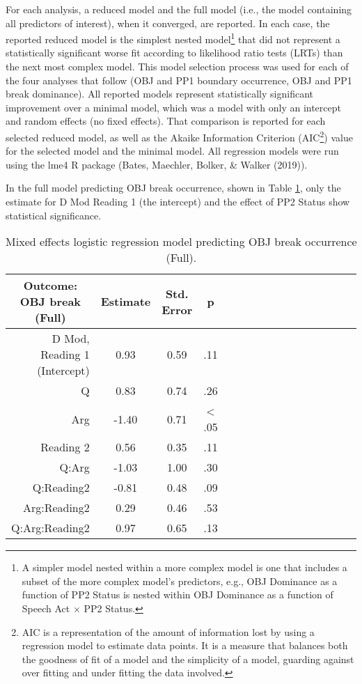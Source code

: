\documentclass[11pt,oneside]{book}
\let\rmarkdownfootnote\footnote%
\def\footnote{\protect\rmarkdownfootnote}
\begin{document}
For each analysis, a reduced model and the full model (i.e., the model containing all predictors of interest), when it converged, are reported. In each case, the reported reduced model is the simplest nested model\footnote{A simpler model nested within a more complex model is one that includes a subset of the more complex model's predictors, e.g., OBJ Dominance as a function of PP2 Status is nested within OBJ Dominance as a function of Speech Act \(\times\) PP2 Status.} that did not represent a statistically significant worse fit according to likelihood ratio tests (LRTs) than the next most complex model. This model selection process was used for each of the four analyses that follow (OBJ and PP1 boundary occurrence, OBJ and PP1 break dominance). All reported models represent statistically significant improvement over a minimal model, which was a model with only an intercept and random effects (no fixed effects). That comparison is reported for each selected reduced model, as well as the Akaike Information Criterion (AIC\footnote{AIC is a representation of the amount of information lost by using a regression model to estimate data points. It is a measure that balances both the goodness of fit of a model and the simplicity of a model, guarding against over fitting and under fitting the data involved.}) value for the selected model and the minimal model. All regression models were run using the lme4 R package (Bates, Maechler, Bolker, \& Walker (2019)).

In the full model predicting OBJ break occurrence, shown in Table \ref{tab:fullobjmod}, only the estimate for D Mod Reading 1 (the intercept) and the effect of PP2 Status show statistical significance.

\begin{table}[!h]

\caption{\label{tab:fullobjmod}Mixed effects logistic regression model predicting OBJ break occurrence (Full).}
\centering
\begin{tabular}{rcccrcccrcccrccc}
\toprule
\multicolumn{1}{c}{Outcome: OBJ break (Full)} & \multicolumn{1}{c}{Estimate} & \multicolumn{1}{c}{Std. Error} & \multicolumn{1}{c}{p}\\
\midrule
D Mod, Reading 1 (Intercept) & 0.93 & 0.59 & .11\\
Q & 0.83 & 0.74 & .26\\
Arg & -1.40 & 0.71 & < .05\\
Reading 2 & 0.56 & 0.35 & .11\\
Q:Arg & -1.03 & 1.00 & .30\\
\addlinespace
Q:Reading2 & -0.81 & 0.48 & .09\\
Arg:Reading2 & 0.29 & 0.46 & .53\\
Q:Arg:Reading2 & 0.97 & 0.65 & .13\\
\bottomrule
\end{tabular}
\end{table}
\end{document}
